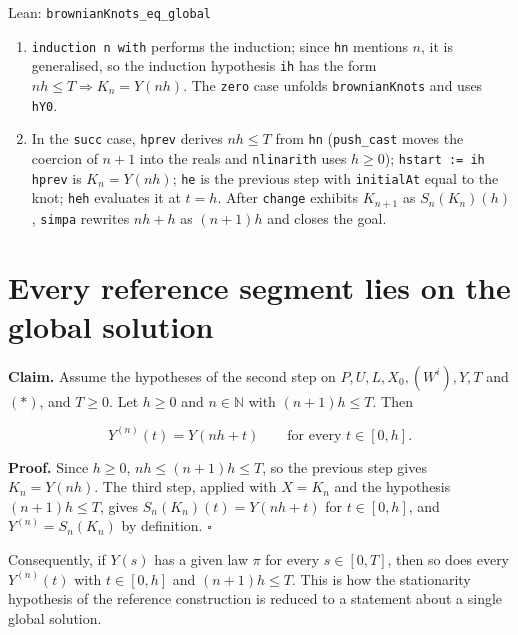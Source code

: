 \documentclass[11pt,a4paper]{article}
\begin{document}
\begin{leanbox}{Lean: \texttt{brownianKnots\_\allowbreak{}eq\_\allowbreak{}global}}
\begin{enumerate}
\item \texttt{induction n with} performs the induction; since \texttt{hn} mentions \(n\), it is generalised, so the induction hypothesis \texttt{ih} has the form \(nh\le T\Rightarrow K_n=Y(nh)\). The \texttt{zero} case unfolds \texttt{brownian\allowbreak{}Knots} and uses \texttt{h\allowbreak{}Y0}.

\item In the \texttt{succ} case, \texttt{hprev} derives \(nh\le T\) from \texttt{hn} (\texttt{push\_\allowbreak{}cast} moves the coercion of \(n+1\) into the reals and \texttt{nlinarith} uses \(h\ge0\)); \texttt{hstart := ih hprev} is \(K_n=Y(nh)\); \texttt{he} is the previous step with \texttt{initial\allowbreak{}At} equal to the knot; \texttt{heh} evaluates it at \(t=h\). After \texttt{change} exhibits \(K_{n+1}\) as \(S_n(K_n)(h)\), \texttt{simpa} rewrites \(nh+h\) as \((n+1)h\) and closes the goal.

\end{enumerate}
\end{leanbox}

\section{\texorpdfstring{Every reference segment lies on the global solution}{Every reference segment lies on the global solution}}


\textbf{Claim.} Assume the hypotheses of the second step on \(P,U,L,X_0,(W^i),Y,T\) and \((\ast)\), and \(T\ge0\). Let \(h\ge0\) and \(n\in\mathbb N\) with \((n+1)h\le T\). Then


\[Y^{(n)}(t)=Y(nh+t)\qquad\text{for every }t\in[0,h].\]


\textbf{Proof.} Since \(h\ge0\), \(nh\le(n+1)h\le T\), so the previous step gives \(K_n=Y(nh)\). The third step, applied with \(X=K_n\) and the hypothesis \((n+1)h\le T\), gives \(S_n(K_n)(t)=Y(nh+t)\) for \(t\in[0,h]\), and \(Y^{(n)}=S_n(K_n)\) by definition. \(\square\)




Consequently, if \(Y(s)\) has a given law \(\pi\) for every \(s\in[0,T]\), then so does every \(Y^{(n)}(t)\) with \(t\in[0,h]\) and \((n+1)h\le T\). This is how the stationarity hypothesis of the reference construction is reduced to a statement about a single global solution.
\end{document}
